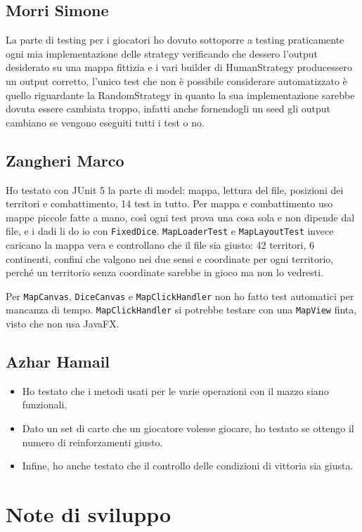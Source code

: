 \documentclass[a4paper,12pt]{report}
\begin{document}
\subsection{Morri Simone}
La parte di testing  per i giocatori ho dovuto sottoporre a testing praticamente ogni mia implementazione delle strategy verificando che dessero l'output desiderato su una mappa fittizia e i vari builder di HumanStrategy producessero un output corretto, l'unico test che non è possibile considerare automatizzato è quello riguardante la RandomStrategy in quanto la sua implementazione sarebbe dovuta essere cambiata troppo, infatti anche fornendogli un seed gli output cambiano se vengono eseguiti tutti i test o no.

\subsection{Zangheri Marco}
Ho testato con JUnit 5 la parte di model: mappa, lettura del file, posizioni dei territori e combattimento, 14 test in tutto. Per mappa e combattimento uso mappe piccole fatte a mano, così ogni test prova una cosa sola e non dipende dal file, e i dadi li do io con \texttt{FixedDice}. \texttt{MapLoaderTest} e \texttt{MapLayoutTest} invece caricano la mappa vera e controllano che il file sia giusto: 42 territori, 6 continenti, confini che valgono nei due sensi e coordinate per ogni territorio, perché un territorio senza coordinate sarebbe in gioco ma non lo vedresti.

Per \texttt{MapCanvas}, \texttt{DiceCanvas} e \texttt{MapClickHandler} non ho fatto test automatici per mancanza di tempo. \texttt{MapClickHandler} si potrebbe testare con una \texttt{MapView} finta, visto che non usa JavaFX.

\subsection{Azhar Hamail}
\begin{itemize}
    \item Ho testato che i metodi usati per le varie operazioni con il mazzo siano funzionali.
    \item Dato un set di carte che un giocatore volesse giocare, ho testato se ottengo il numero di reinforzamenti giusto.
    \item Infine, ho anche testato che il controllo delle condizioni di vittoria sia giusta.
\end{itemize}

\section{Note di sviluppo}
\end{document}
